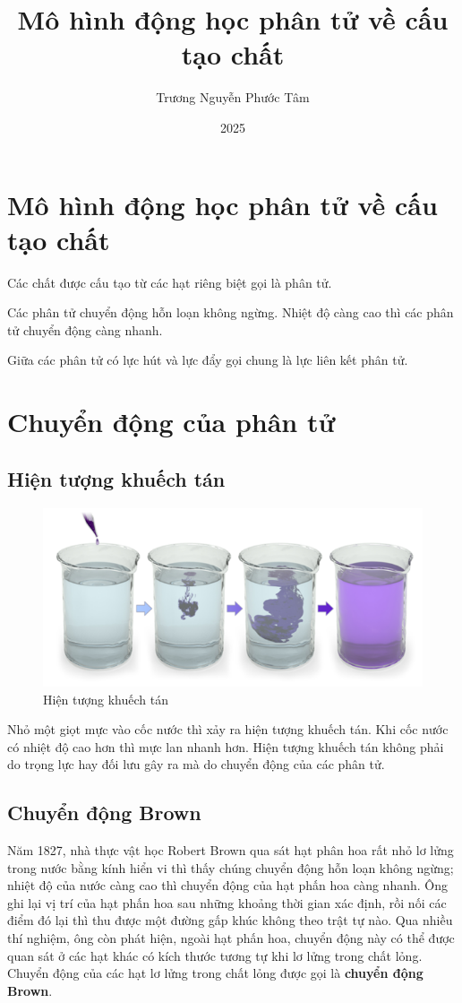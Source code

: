 \documentclass[a4paper, 12pt]{article}
\title{Mô hình động học phân tử về cấu tạo chất}
\author{Trương Nguyễn Phước Tâm}
\date{2025}
\begin{document}
	
\maketitle

\section{Mô hình động học phân tử về cấu tạo chất}

\raisebox{0.3ex}{\tiny$\bullet$} Các chất được cấu tạo từ các hạt riêng biệt gọi là phân tử.

\raisebox{0.3ex}{\tiny$\bullet$} Các phân tử chuyển động hỗn loạn không ngừng. Nhiệt độ càng cao thì các phân tử chuyển động càng nhanh.

\raisebox{0.3ex}{\tiny$\bullet$} Giữa các phân tử có lực hút và lực đẩy gọi chung là lực liên kết phân tử.


\section{Chuyển động của phân tử}
\subsection{Hiện tượng khuếch tán}

\begin{figure}[H]
	\centering
	\includegraphics[width=0.3\linewidth]{img/Picture1.png}
	\caption{Hiện tượng khuếch tán}
\end{figure}

Nhỏ một giọt mực vào cốc nước thì xảy ra hiện tượng khuếch tán. Khi cốc nước có nhiệt độ cao hơn thì mực lan nhanh hơn. Hiện tượng khuếch tán không phải do trọng lực hay đối lưu gây ra mà do chuyển động của các phân tử.

\subsection{Chuyển động Brown}

Năm 1827, nhà thực vật học Robert Brown qua sát hạt phân hoa rất nhỏ lơ lửng trong nước bằng kính hiển vi thì thấy chúng chuyển động hỗn loạn không ngừng; nhiệt độ của nước càng cao thì chuyển động của hạt phấn hoa càng nhanh. Ông ghi lại vị trí của hạt phấn hoa sau những khoảng thời gian xác định, rồi nối các điểm đó lại thì thu được một đường gấp khúc không theo trật tự nào. Qua nhiều thí nghiệm, ông còn phát hiện, ngoài hạt phấn hoa, chuyển động này có thể được quan sát ở các hạt khác có kích thước tương tự khi lơ lửng trong chất lỏng. Chuyển động của các hạt lơ lửng trong chất lỏng được gọi là \textbf{chuyển động Brown}.
\end{document}
